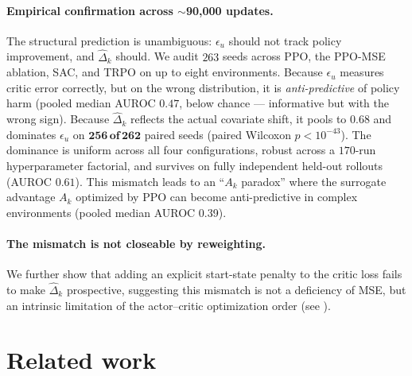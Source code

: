 \documentclass{article}
\begin{document}
\paragraph{Empirical confirmation across $\sim$90{,}000 updates.}
The structural prediction is unambiguous: $\epsilon_u$ should not track policy improvement, and $\hat\Delta_k$ should. We audit $263$ seeds across PPO, the PPO-MSE ablation, SAC, and TRPO on up to eight environments. Because $\epsilon_u$ measures critic error correctly, but on the wrong distribution, it is \emph{anti-predictive} of policy harm (pooled median AUROC $0.47$, below chance --- informative but with the wrong sign). Because $\hat\Delta_k$ reflects the actual covariate shift, it pools to $0.68$ and dominates $\epsilon_u$ on $\mathbf{256\,\text{of}\,262}$ paired seeds (paired Wilcoxon $p < 10^{-43}$). The dominance is uniform across all four configurations, robust across a $170$-run hyperparameter factorial, and survives on fully independent held-out rollouts (AUROC $0.61$). This mismatch leads to an ``$A_k$ paradox'' where the surrogate advantage $A_k$ optimized by PPO can become anti-predictive in complex environments (pooled median AUROC 0.39).

\paragraph{The mismatch is not closeable by reweighting.}
We further show that adding an explicit start-state penalty to the critic loss fails to make $\hat\Delta_k$ prospective, suggesting this mismatch is not a deficiency of MSE, but an intrinsic limitation of the actor--critic optimization order (see ).

\section{Related work}
\label{sec:related}
\end{document}
